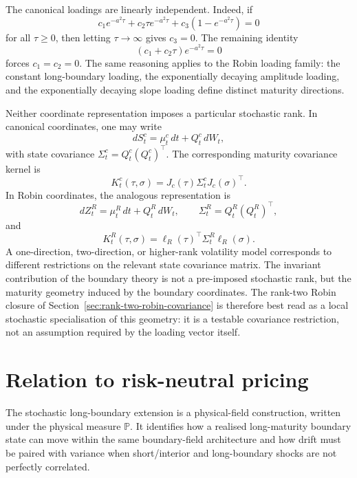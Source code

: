 \documentclass[11pt]{article}
\numberwithin{equation}{section}
\begin{document}
The canonical loadings are linearly independent.  Indeed, if
\[
c_1e^{-a^2\tau}+c_2\tau e^{-a^2\tau}+c_3(1-e^{-a^2\tau})=0
\]
for all \(\tau\ge0\), then letting \(\tau\to\infty\) gives \(c_3=0\).  The remaining identity
\[
(c_1+c_2\tau)e^{-a^2\tau}=0
\]
forces \(c_1=c_2=0\).  The same reasoning applies to the Robin loading family: the constant long-boundary loading, the exponentially decaying amplitude loading, and the exponentially decaying slope loading define distinct maturity directions.

Neither coordinate representation imposes a particular stochastic rank.  In canonical coordinates, one may write
\[
dS^c_t=\mu^c_t\,dt+Q^c_t\,dW_t,
\]
with state covariance \(\Sigma^c_t=Q^c_t(Q^c_t)^\top\).  The corresponding maturity covariance kernel is
\begin{equation}
\label{eq:jacobian-covariance-kernel}
K^c_t(\tau,\sigma)=J_c(\tau)\Sigma^c_tJ_c(\sigma)^\top.
\end{equation}
In Robin coordinates, the analogous representation is
\[
dZ^R_t=\mu^R_t\,dt+Q^R_t\,dW_t,
\qquad
\Sigma^R_t=Q^R_t(Q^R_t)^\top,
\]
and
\begin{equation}
\label{eq:robin-covariance-kernel-section10}
K^R_t(\tau,\sigma)=\ell_R(\tau)^\top\Sigma^R_t\ell_R(\sigma).
\end{equation}
A one-direction, two-direction, or higher-rank volatility model corresponds to different restrictions on the relevant state covariance matrix.  The invariant contribution of the boundary theory is not a pre-imposed stochastic rank, but the maturity geometry induced by the boundary coordinates.  The rank-two Robin closure of Section~\ref{sec:rank-two-robin-covariance} is therefore best read as a local stochastic specialisation of this geometry: it is a testable covariance restriction, not an assumption required by the loading vector itself.

\section{Relation to risk-neutral pricing}

The stochastic long-boundary extension is a physical-field construction, written under the physical measure \(\mathbb P\). It identifies how a realised long-maturity boundary state can move within the same boundary-field architecture and how drift must be paired with variance when short/interior and long-boundary shocks are not perfectly correlated.
\end{document}
